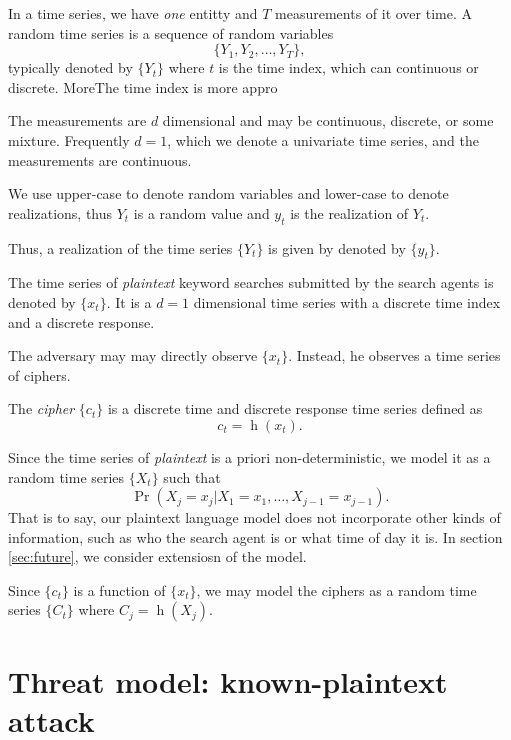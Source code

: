 \documentclass[final,
  11pt,
]{article}
\begin{document}
In a time series, we have \emph{one} entitty and \(T\) measurements of
it over time. A random time series is a sequence of random variables \[
  \{Y_1,Y_2,\ldots,Y_T\},
\] typically denoted by \(\{Y_t\}\) where \(t\) is the time index, which
can continuous or discrete. MoreThe time index is more appro

The measurements are \(d\) dimensional and may be continuous, discrete,
or some mixture. Frequently \(d=1\), which we denote a univariate time
series, and the measurements are continuous.

We use upper-case to denote random variables and lower-case to denote
realizations, thus \(Y_t\) is a random value and \(y_t\) is the
realization of \(Y_t\).

Thus, a realization of the time series \(\{Y_t\}\) is given by denoted
by \(\{y_t\}\).

The time series of \emph{plaintext} keyword searches submitted by the
search agents is denoted by \(\{x_t\}\). It is a \(d=1\) dimensional
time series with a discrete time index and a discrete response.

The adversary may may directly observe \(\{x_t\}\). Instead, he observes
a time series of ciphers.

\begin{definition}
The \emph{cipher} $\{c_t\}$ is a discrete time and discrete
response time series defined as
$$
  c_t = \operatorname{h}(x_t).
$$
\end{definition}

Since the time series of \emph{plaintext} is a priori non-deterministic,
we model it as a random time series \(\{X_t\}\) such that
\begin{equation}
    \Pr(X_j = x_j | X_1 = x_1,\ldots,X_{j-1} = x_{j-1}).
\end{equation} That is to say, our plaintext language model does not
incorporate other kinds of information, such as who the search agent is
or what time of day it is. In section \ref{sec:future}, we consider
extensiosn of the model.

Since \(\{c_t\}\) is a function of \(\{x_t\}\), we may model the ciphers
as a random time series \(\{ C_t \}\) where
\(C_j = \operatorname{h}(X_j)\).

\hypertarget{threat-model-known-plaintext-attack}{%
\section{Threat model: known-plaintext
attack}\label{threat-model-known-plaintext-attack}}
\end{document}
